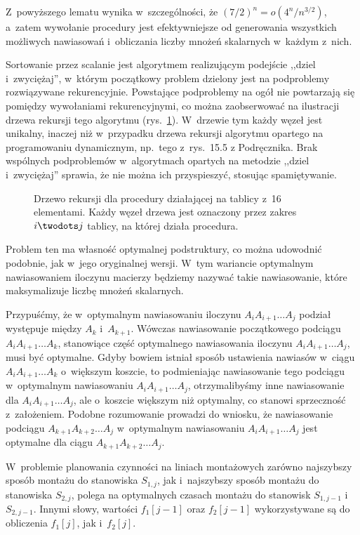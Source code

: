 Z~powyższego lematu wynika w~szczególności, że $(7/2)^n=o(4^n\!/n^{3/2})$, a~zatem wywołanie procedury  jest efektywniejsze od generowania wszystkich możliwych nawiasowań i~obliczania liczby mnożeń skalarnych w~każdym z~nich.

\exercise %
Sortowanie przez scalanie jest algorytmem realizującym podejście ,,dziel i~zwyciężaj'', w~którym początkowy problem dzielony jest na podproblemy rozwiązywane rekurencyjnie.
Powstające podproblemy na ogół nie powtarzają się pomiędzy wywołaniami rekurencyjnymi, co można zaobserwować na ilustracji drzewa rekursji tego algorytmu (rys.\ \ref{fig:15.3-2}).
W~drzewie tym każdy węzeł jest unikalny, inaczej niż w~przypadku drzewa rekursji algorytmu opartego na programowaniu dynamicznym, np.\ tego z~rys.\ 15.5 z Podręcznika.
Brak wspólnych podproblemów w~algorytmach opartych na metodzie ,,dziel i~zwyciężaj'' sprawia, że nie można ich przyspieszyć, stosując spamiętywanie.
\begin{figure}[!ht]
	\centering 
	\caption{Drzewo rekursji dla procedury  działającej na tablicy z~16 elementami.
Każdy węzeł drzewa jest oznaczony przez zakres $i\twodots j$ tablicy, na której działa procedura.} \label{fig:15.3-2}
\end{figure}

\exercise %
Problem ten ma własność optymalnej podstruktury, co można udowodnić podobnie, jak w~jego oryginalnej wersji.
W~tym wariancie optymalnym nawiasowaniem iloczynu macierzy będziemy nazywać takie nawiasowanie, które maksymalizuje liczbę mnożeń skalarnych.

Przypuśćmy, że w~optymalnym nawiasowaniu iloczynu $A_iA_{i+1}\dots A_j$ podział występuje między $A_k$ i~$A_{k+1}$.
Wówczas nawiasowanie początkowego podciągu $A_iA_{i+1}\dots A_k$, stanowiące część optymalnego nawiasowania iloczynu $A_iA_{i+1}\dots A_j$, musi być optymalne.
Gdyby bowiem istniał sposób ustawienia nawiasów w~ciągu $A_iA_{i+1}\dots A_k$ o~większym koszcie, to podmieniając nawiasowanie tego podciągu w~optymalnym nawiasowaniu $A_iA_{i+1}\dots A_j$, otrzymalibyśmy inne nawiasowanie dla $A_iA_{i+1}\dots A_j$, ale o~koszcie większym niż optymalny, co stanowi sprzeczność z~założeniem.
Podobne rozumowanie prowadzi do wniosku, że nawiasowanie podciągu $A_{k+1}A_{k+2}\dots A_j$ w~optymalnym nawiasowaniu $A_iA_{i+1}\dots A_j$ jest optymalne dla ciągu $A_{k+1}A_{k+2}\dots A_j$.

\exercise %
W~problemie planowania czynności na liniach montażowych zarówno najszybszy sposób montażu do stanowiska $S_{1,j}$, jak i~najszybszy sposób montażu do stanowiska $S_{2,j}$, polega na optymalnych czasach montażu do stanowisk $S_{1,j-1}$ i~$S_{2,j-1}$.
Innymi słowy, wartości $f_1[j-1]$ oraz $f_2[j-1]$ wykorzystywane są do obliczenia $f_1[j]$, jak i~$f_2[j]$.

\exercise %
